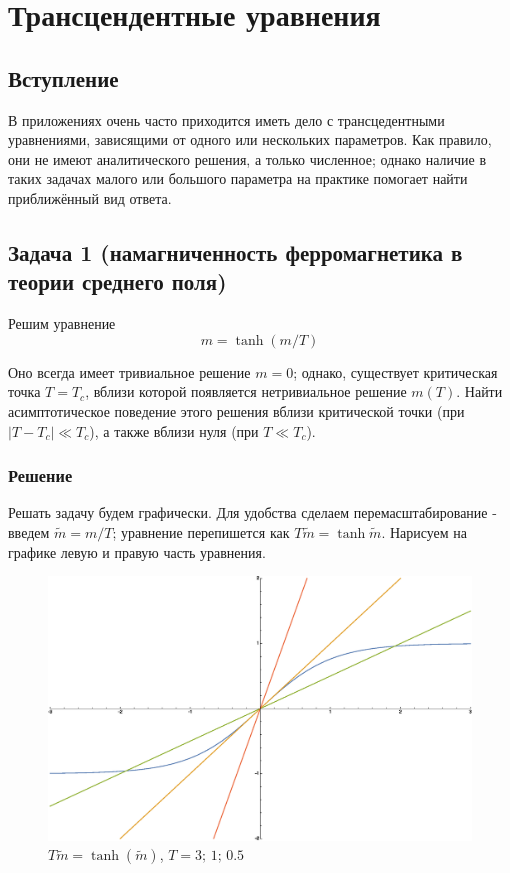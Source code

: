 \documentclass[a4paper,12pt]{article}
\begin{document}
\section{Трансцендентные уравнения}

\subsection{Вступление}

В приложениях очень часто приходится иметь дело с трансцедентными
уравнениями, зависящими от одного или нескольких параметров. Как правило,
они не имеют аналитического решения, а только численное; однако наличие
в таких задачах малого или большого параметра на практике помогает
найти приближённый вид ответа.


\subsection{Задача 1 (намагниченность ферромагнетика в теории среднего поля)}

Решим уравнение 
\[
m=\tanh(m/T)
\]


\noindent
Оно всегда имеет тривиальное решение $m=0$; однако, существует критическая
точка $T=T_{c}$, вблизи которой появляется нетривиальное решение
$m(T)$. Найти асимптотическое поведение этого решения вблизи критической
точки (при $\left|T-T_{c}\right|\ll T_{c}$), а также вблизи нуля
(при $T\ll T_{c}$).


\subsubsection{Решение}

Решать задачу будем графически. Для удобства сделаем перемасштабирование
- введем $\tilde{m}=m/T$; уравнение перепишется как $T\tilde{m}=\tanh\tilde{m}$.
Нарисуем на графике левую и правую часть уравнения.

\begin{figure}[h]
	\caption{$T\tilde{m}=\tanh(\tilde{m})$, $T=3;\,1;\,0.5$}
	\centering
	\includegraphics[width=0.65\columnwidth]{tanhpic.eps}
\end{figure}
\end{document}

